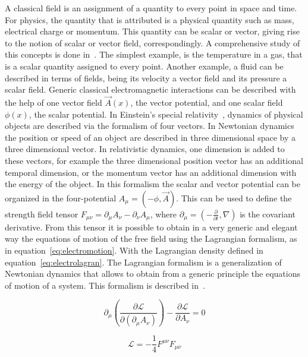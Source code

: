 A classical field is an assignment of a quantity to every point in space and time. For physics, the quantity that is attributed is a physical quantity such as mass, electrical charge or momentum. This quantity can be scalar or vector, giving rise to the notion of scalar or vector field, correspondingly. A comprehensive study of this concepts is done in~\cite{Feynman:2013}. The simplest example, is the temperature in a gas, that is a scalar quantity assigned to every point. Another example, a fluid can be described in terms of fields, being its velocity a vector field and its pressure a scalar field. Generic classical electromagnetic interactions can be described with the help of one vector field $\vec{A}(x)$, the vector potential, and one scalar field $\phi(x)$, the scalar potential. In Einstein's special relativity~\cite{Einstein:1905ve}, dynamics of physical objects are described via the formalism of four vectors. In Newtonian dynamics~\cite{Goldstein:2001} the position or speed of an object are described in three dimensional space by a three dimensional vector. In relativistic dynamics, one dimension is added to these vectors, for example the three dimensional position vector has an additional temporal dimension, or the momentum vector has an additional dimension with the energy of the object. In this formalism the scalar and vector potential can be organized in the four-potential $A_{\mu}=(-\phi,\vec{A})$. This can be used to define the strength field tensor $F_{\mu\nu}=\partial_{\mu}A_{\nu}-\partial_{\nu}A_{\mu}$, where $\partial_{\mu}=\left( -\frac{\partial}{\partial t},\nabla\right)$ is the covariant derivative. From this tensor it is possible to obtain in a very generic and elegant way the equations of motion of the free field using the Lagrangian formalism, as in equation~\ref{eq:electromotion}. With the Lagrangian density defined in equation~\ref{eq:electrolagran}. The Lagrangian formalism is a generalization of Newtonian dynamics that allows to obtain from a generic principle the equations of motion of a system. This formalism is described in~\cite{Maggiore:2005qv}. 

\begin{equation}
  \label{eq:electromotion}
  \partial_{\mu}\left( \frac{\partial \mathcal{L}}{\partial (\partial_{\mu}A_{\nu})} \right) -\frac{\partial \mathcal{L}}{\partial A_{\nu}}=0
\end{equation}

\begin{equation}
  \label{eq:electrolagran}
  \mathcal{L}=-\frac{1}{4}F^{\mu\nu}F_{\mu\nu}
\end{equation}

